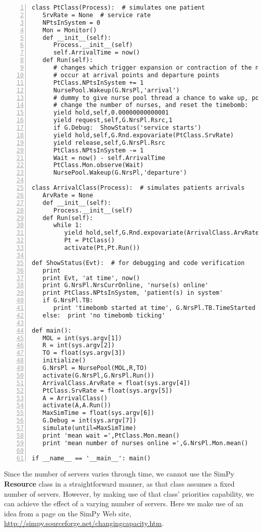 \documentclass[11pt]{article}
\begin{document}
\begin{Verbatim}[fontsize=\relsize{-2},numbers=left]
class PtClass(Process):  # simulates one patient
   SrvRate = None  # service rate
   NPtsInSystem = 0  
   Mon = Monitor()
   def __init__(self):
      Process.__init__(self)
      self.ArrivalTime = now()
   def Run(self):
      # changes which trigger expansion or contraction of the nurse pool
      # occur at arrival points and departure points
      PtClass.NPtsInSystem += 1
      NursePool.Wakeup(G.NrsPl,'arrival')  
      # dummy to give nurse pool thread a chance to wake up, possibly
      # change the number of nurses, and reset the timebomb:
      yield hold,self,0.00000000000001
      yield request,self,G.NrsPl.Rsrc,1
      if G.Debug:  ShowStatus('service starts')
      yield hold,self,G.Rnd.expovariate(PtClass.SrvRate)
      yield release,self,G.NrsPl.Rsrc
      PtClass.NPtsInSystem -= 1
      Wait = now() - self.ArrivalTime
      PtClass.Mon.observe(Wait)
      NursePool.Wakeup(G.NrsPl,'departure')

class ArrivalClass(Process):  # simulates patients arrivals
   ArvRate = None 
   def __init__(self):
      Process.__init__(self)  
   def Run(self):
      while 1:
         yield hold,self,G.Rnd.expovariate(ArrivalClass.ArvRate)
         Pt = PtClass()
         activate(Pt,Pt.Run())

def ShowStatus(Evt):  # for debugging and code verification
   print 
   print Evt, 'at time', now()
   print G.NrsPl.NrsCurrOnline, 'nurse(s) online'
   print PtClass.NPtsInSystem, 'patient(s) in system'
   if G.NrsPl.TB:
      print 'timebomb started at time', G.NrsPl.TB.TimeStarted
   else:  print 'no timebomb ticking'

def main():
   MOL = int(sys.argv[1])
   R = int(sys.argv[2])
   TO = float(sys.argv[3])
   initialize()
   G.NrsPl = NursePool(MOL,R,TO)
   activate(G.NrsPl,G.NrsPl.Run())
   ArrivalClass.ArvRate = float(sys.argv[4])
   PtClass.SrvRate = float(sys.argv[5])
   A = ArrivalClass()
   activate(A,A.Run())
   MaxSimTime = float(sys.argv[6])
   G.Debug = int(sys.argv[7])
   simulate(until=MaxSimTime)
   print 'mean wait =',PtClass.Mon.mean()
   print 'mean number of nurses online =',G.NrsPl.Mon.mean()

if __name__ == '__main__': main()
\end{Verbatim}

Since the number of servers varies through time, we cannot use the SimPy
{\bf Resource} class in a straightforward manner, as that class assumes
a fixed number of servers.  However, by making use of that class'
priorities capability, we can achieve the effect of a varying number of
servers.  Here we make use of an idea from a page on the SimPy Web site,
\url{http://simpy.sourceforge.net/changingcapacity.htm}.
\end{document}

